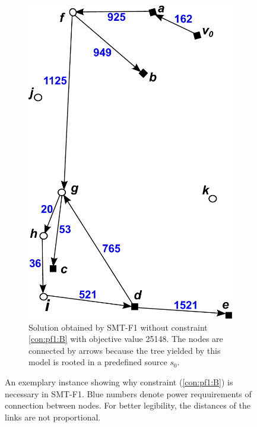 \begin{figure}[!htb]
\begin{subfigure}[b]{0.4\textwidth}
        \includegraphics[width=\textwidth]{conBNec2}
        \caption{Solution obtained by SMT-F1 without constraint \ref{con:pf1:B} with objective value 25148. The nodes are connected by arrows because the tree yielded by this model is rooted in a predefined source $s_0$.}
        \label{fig:Bpf2}
    \end{subfigure}
    \caption{An exemplary instance showing why constraint (\ref{con:pf1:B}) is necessary in SMT-F1. Blue numbers denote power requuirements of connection between nodes. For better legibility, the distances of the links are not proportional.} \label{fig:BProof}
\end{figure}   

